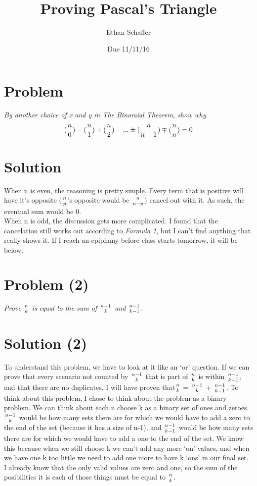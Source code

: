\documentclass[11pt]{article} %
\title{Proving Pascal's Triangle}
\author{Ethan Schaffer}
\date{Due 11/11/16}
\newcommand\tab[1][1cm]{\hspace*{#1}}
\begin{document}
\maketitle
\section* {Problem}
\textit{By another choice of x and y in The Binomial Theorem, show why}
\begin{equation}
({n\atop 0}) - ({n\atop 1}) + ({n\atop 2}) - ... \pm ({n\atop n-1}) \mp ({n\atop n}) = 0
\end{equation}
\section*{Solution}
\tab When n is even, the reasoning is pretty simple. Every term that is positive will have it's opposite ($n \atop p$'s opposite would be $n \atop {n-p}$) cancel out with it. As such, the eventual sum would be 0.
\\ \tab When n is odd, the discussion gets more complicated. I found that the cancelation still works out according to \textit{Formula 1}, but I can't find anything that really shows it. If I reach an epiphany before class starts tomorrow, it will be below:

\newpage

\section*{Problem (2)}
\textit{Prove $n \atop k$ is equal to the sum of $n-1 \atop k$ and $n-1 \atop k-1$.}

\section* {Solution (2)}
\tab To understand this problem, we have to look at it like an `or' question. If we can prove that every scenario not counted by $n-1 \atop k$ that is part of $n \atop k$ is within $n-1 \atop k-1$, and that there are no duplicates, I will have proven that$n \atop k$ = $n-1 \atop k$ + $n-1 \atop k-1$. To think about this problem, I chose to think about the problem as a binary problem. We can think about each n choose k as a binary set of ones and zeroes. $n-1 \atop k$ would be how many sets there are for which we would have to add a zero to the end of the set (because it has a size of n-1), and $n-1 \atop k-1$ would be how many sets there are for which we would have to add a one to the end of the set. We know this because when we still choose k we can't add any more `on' values, and when we have one k too little we need to add one more to have k `ons' in our final set.
\\ \tab I already know that the only valid values are zero and one, so the sum of the posibilities it is each of those things must be equal to $n \atop k$.
\end{document}
